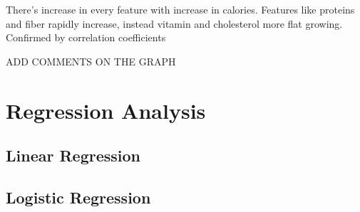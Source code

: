 \documentclass[
]{article}
\begin{document}
There's increase in every feature with increase in calories. Features
like proteins and fiber rapidly increase, instead vitamin and
cholesterol more flat growing. Confirmed by correlation coefficients

ADD COMMENTS ON THE GRAPH

\section{Regression Analysis}\label{regression-analysis}

\subsection{Linear Regression}\label{linear-regression}

\subsection{Logistic Regression}\label{logistic-regression}
\end{document}
